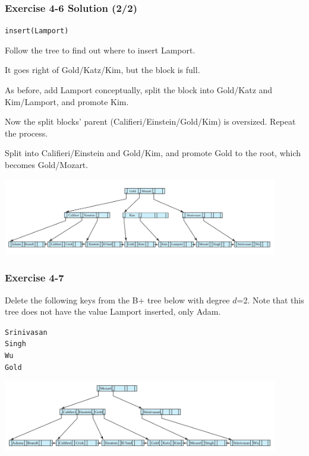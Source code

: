 \begin{frame}
\frametitle{Exercise 4-6 Solution (2/2)}

\texttt{insert(Lamport)}

Follow the tree to find out where to insert Lamport.

It goes right of Gold/Katz/Kim, but the block is full.

As before, add Lamport conceptually, split the block into Gold/Katz and Kim/Lamport, and promote Kim.

Now the split blocks' parent (Califieri/Einstein/Gold/Kim) is oversized. Repeat the process.

Split into Califieri/Einstein and Gold/Kim, and promote Gold to the root, which becomes Gold/Mozart.

\begin{center}
  \includegraphics[width=0.9\textwidth]{images/b-tree-insert_lamport.png}
\end{center}

\end{frame}


\begin{frame}
\frametitle{Exercise 4-7}

Delete the following keys from the B+ tree below with degree $d$=2. Note that this tree does not have the value Lamport inserted, only Adam.

\texttt{Srinivasan}\\
\texttt{Singh}\\
\texttt{Wu}\\
\texttt{Gold}

\begin{center}
  \includegraphics[width=0.9\textwidth]{images/b-tree-insert_adams.png}
\end{center}

\end{frame}


